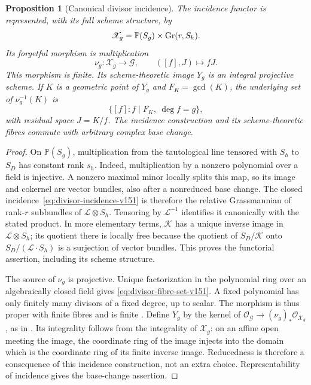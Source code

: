 \documentclass[11pt,reqno]{amsart}
\numberwithin{equation}{section}
\newtheorem{proposition}[theorem]{Proposition}
\theoremstyle{definition}\newtheorem{definition}[theorem]{Definition}
\theoremstyle{remark}\newtheorem{remark}[theorem]{Remark}
\newcommand{\Pj}{\mathbb P}\newcommand{\A}{\mathbb A}
\newcommand{\OO}{\mathcal O}\newcommand{\II}{\mathcal I}
\begin{document}
\begin{proposition}[Canonical divisor incidence]
\label{prop:incidence-v151}
The incidence functor is represented, with its full scheme structure, by
\[
 \mathscr X_g=\Pj(S_g)\times\Gr(r,S_h).
\]
Its forgetful morphism is multiplication
\begin{equation}\label{eq:normalization-map-v151}
 \nu_g:\mathscr X_g\longrightarrow\mathscr G,
                   \qquad ([f],J)\longmapsto fJ.
\end{equation}
This morphism is finite.  Its scheme-theoretic image \(Y_g\) is an
integral projective scheme.  If \(K\) is a geometric point of \(Y_g\)
and \(F_K=\gcd(K)\), the underlying set of \(\nu_g^{-1}(K)\) is
\begin{equation}\label{eq:divisor-fibre-set-v151}
       \{[f]: f\mid F_K,\ \deg f=g\},
\end{equation}
with residual space \(J=K/f\).  The incidence construction and its
scheme-theoretic fibres commute with arbitrary complex base change.
\end{proposition}
\begin{proof}
On \(\Pj(S_g)\), multiplication from the tautological line tensored
with \(S_h\) to \(S_D\) has constant rank \(s_h\).  Indeed,
multiplication by a nonzero polynomial over a field is injective.
A nonzero maximal minor locally splits this map, so its image and
cokernel are vector bundles, also after a nonreduced base change.
The closed incidence~\eqref{eq:divisor-incidence-v151} is therefore
the relative Grassmannian of rank-\(r\) subbundles of
\(\mathcal L\otimes S_h\).  Tensoring by \(\mathcal L^{-1}\)
identifies it canonically with the stated product.  In more elementary
terms, \(\mathcal K\) has a unique inverse image in
\(\mathcal L\otimes S_h\); its quotient there is locally free
because the quotient of \(S_D/\mathcal K\) onto
\(S_D/(\mathcal L\cdot S_h)\) is a surjection of vector bundles.
This proves the functorial assertion, including its scheme structure.

The source of \(\nu_g\) is projective.  Unique factorization in the
polynomial ring over an algebraically closed field gives
\eqref{eq:divisor-fibre-set-v151}.  A fixed polynomial has only finitely
many divisors of a fixed degree, up to scalar.  The morphism is thus
proper with finite fibres and is finite
\cite[Tag~02LS]{StacksFiniteV151}.
Define \(Y_g\) by the kernel of
\(\OO_{\mathscr G}\to(\nu_g)_*\OO_{\mathscr X_g}\), as in
\cite[Tag~01R5]{StacksImageV151}.  Its integrality follows from the
integrality of \(\mathscr X_g\): on an affine open meeting the image,
the coordinate ring of the image injects into the domain which is the
coordinate ring of its finite inverse image.  Reducedness is therefore
a consequence of this incidence construction, not an extra choice.
Representability of incidence gives the base-change assertion.
\end{proof}
\end{document}
